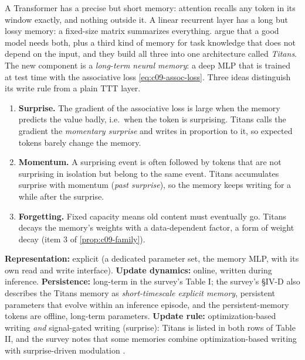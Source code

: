 A Transformer has a precise but short memory: attention recalls any token in its window
exactly, and nothing outside it. A linear recurrent layer has a long but lossy memory: a
fixed-size matrix summarizes everything. \citet{behrouz2025titans} argue that a good model
needs both, plus a third kind of memory for task knowledge that does not depend on the input,
and they build all three into one architecture called \emph{Titans}. The new component is a
\emph{long-term neural memory}: a deep MLP that is trained at test time with the associative
loss \eqref{eq:c09-assoc-loss}. Three ideas distinguish its write rule from a plain TTT layer.
\begin{enumerate}
  \item \textbf{Surprise.} The gradient of the associative loss is large when the memory
        predicts the value badly, i.e.\ when the token is surprising. Titans calls the
        gradient the \emph{momentary surprise} and writes in proportion to it, so expected
        tokens barely change the memory.
  \item \textbf{Momentum.} A surprising event is often followed by tokens that are not
        surprising in isolation but belong to the same event. Titans accumulates surprise
        with momentum (\emph{past surprise}), so the memory keeps writing for a while after
        the surprise.
  \item \textbf{Forgetting.} Fixed capacity means old content must eventually go. Titans
        decays the memory's weights with a data-dependent factor, a form of weight decay
        (item 3 of \cref{prop:c09-family}).
\end{enumerate}

\begin{taxonomy}
\textbf{Representation:} explicit (a dedicated parameter set, the memory MLP, with its own
read and write interface). \textbf{Update dynamics:} online, written during inference.
\textbf{Persistence:} long-term in the survey's Table I; the survey's \S IV-D also describes
the Titans memory as \emph{short-timescale explicit memory}, persistent parameters that
evolve within an inference episode, and the persistent-memory tokens are offline, long-term
parameters. \textbf{Update rule:} optimization-based writing \emph{and} signal-gated writing
(surprise): Titans is listed in both rows of Table II, and the survey notes that some memories
combine optimization-based writing with surprise-driven modulation \citep{zhoubian2026memory}.
\end{taxonomy}


